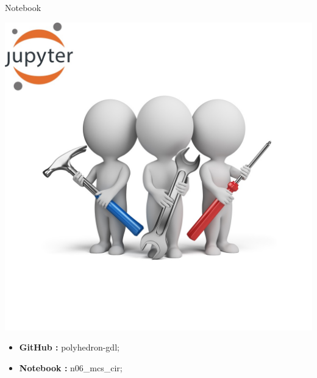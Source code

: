 \documentclass[11pt]{beamer}
\begin{document}
\begin{frame}{Notebook}
\noindent\begin{minipage}{0.5\textwidth}%
\includegraphics[width=\linewidth]{img/exercise.jpg}
\end{minipage}%
\hfill%
\begin{minipage}{0.5\textwidth}
\begin{itemize}
\item {\bf GitHub        : }    polyhedron-gdl;
\item {\bf Notebook   : }    n06\_mcs\_cir;
\end{itemize}
\end{minipage}
\end{frame}
\end{document}
